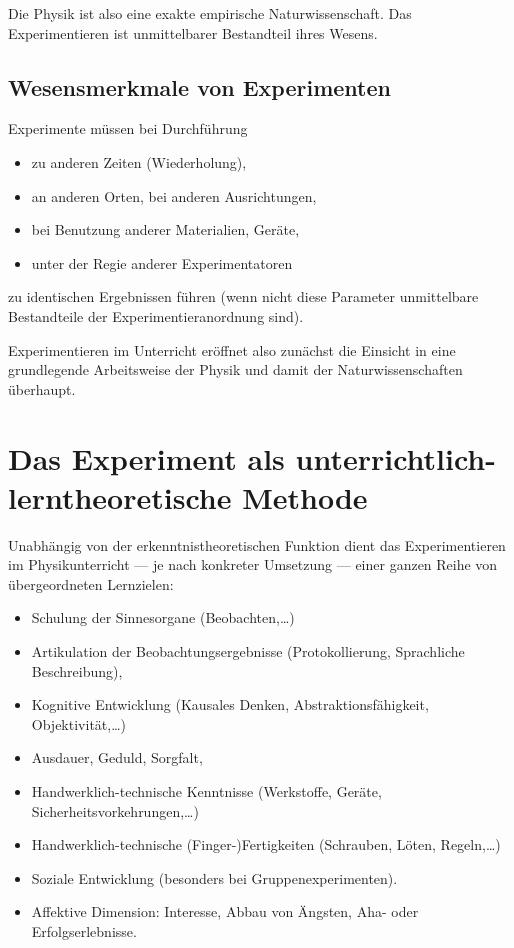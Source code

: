 Die Physik ist also eine exakte empirische Naturwissenschaft.
Das Experimentieren ist unmittelbarer Bestandteil ihres Wesens.

\subsection*{Wesensmerkmale von Experimenten}

Experimente m\"{u}ssen bei Durchf\"{u}hrung
\begin{itemize}
	\item
	zu anderen Zeiten (Wiederholung),
	\item
	an anderen Orten, bei anderen Ausrichtungen,
	\item
	bei Benutzung anderer Materialien, Ger\"{a}te,
	\item
	unter der Regie anderer Experimentatoren
\end{itemize}
zu identischen Ergebnissen f\"{u}hren
(wenn nicht diese Parameter unmittelbare Bestandteile der
Experimentieranordnung sind).

\bip

Experimentieren im Unterricht er\"{o}ffnet also zun\"{a}chst die
Einsicht in eine grundlegende Arbeitsweise der Physik und
damit der Naturwissenschaften \"{u}berhaupt.


\bip\bip
\section{Das Experiment als unterrichtlich-lerntheoretische
                                          Methode}

Unabh\"{a}ngig von der erkenntnistheoretischen Funktion dient das
Experimentieren im Physikunterricht
--- je nach konkreter Umsetzung ---
einer ganzen Reihe von \"{u}bergeordneten Lernzielen:

\begin{itemize}
	\item
	Schulung der Sinnesorgane (Beobachten,\dots)
	\item
	Artikulation der Beobachtungsergebnisse (Protokollierung,
	Sprachliche Beschreibung),
	\item
	Kognitive Entwicklung (Kausales Denken, Abstraktionsf\"{a}higkeit,
	                                Objektivit\"{a}t,\dots)
	\item
	Ausdauer, Geduld, Sorgfalt,
	\item
	Handwerklich-technische Kenntnisse
	(Werkstoffe, Ger\"{a}te, Sicherheitsvorkehrungen,\dots)
	\item
	Handwerklich-technische (Finger-)Fertigkeiten
	(Schrauben, L\"{o}ten, Regeln,\dots)
	\item
	Soziale Entwicklung (besonders bei Gruppenexperimenten).
	\item
	Affektive Dimension: Interesse, Abbau von \"{A}ngsten,
	Aha-  oder Erfolgserlebnisse.
\end{itemize}


